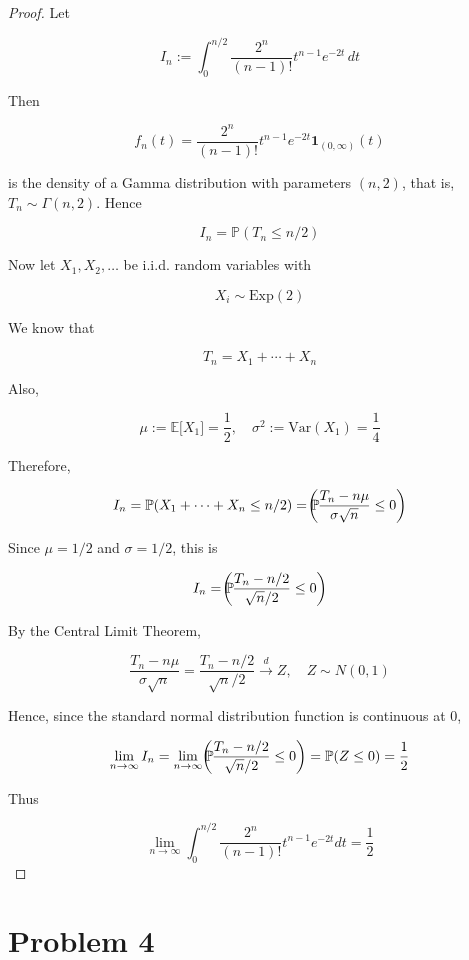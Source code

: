 \documentclass{qlnotes-export}
\begin{document}
\begin{proof}

Let

\[I_{n} := \int_{0}^{n/2}\frac{2^{n}}{(n - 1)!}t^{n - 1}e^{- 2t}\, dt\]

Then

\[f_{n}(t) = \frac{2^{n}}{(n - 1)!}t^{n - 1}e^{- 2t}\mathbf{1}_{(0,\infty)}(t)\]

is the density of a Gamma distribution with parameters \((n,2)\), that is, \(T_{n} \sim \Gamma(n,2)\). Hence

\[I_{n} = {\mathbb{P}}(T_{n} \leq n/2)\]

Now let \(X_{1},X_{2},\ldots\) be i.i.d. random variables with

\[X_{i} \sim \text{Exp}(2)\]

We know that

\[T_{n} = X_{1} + \cdots + X_{n}\]

Also,

\[\mu := {\mathbb{E}}\lbrack X_{1}\rbrack = \frac{1}{2},\quad\sigma^{2} := \text{Var}(X_{1}) = \frac{1}{4}\]

Therefore,

\[I_{n} = {\mathbb{P}}(X_{1} + \cdots + X_{n} \leq n/2) = {\mathbb{P}}\mspace{-18mu}\left( {\frac{T_{n} - n\mu}{\sigma\sqrt{n}} \leq 0} \right)\]

Since \(\mu = 1/2\) and \(\sigma = 1/2\), this is

\[I_{n} = {\mathbb{P}}\mspace{-18mu}\left( {\frac{T_{n} - n/2}{\sqrt{n}/2} \leq 0} \right)\]

By the Central Limit Theorem,

\[\frac{T_{n} - n\mu}{\sigma\sqrt{n}} = \frac{T_{n} - n/2}{\sqrt{n}/2}\overset{d}{\rightarrow}Z,\quad Z \sim N(0,1)\]

Hence, since the standard normal distribution function is continuous at \(0\),

\[\lim\limits_{n\rightarrow\infty}I_{n} = \lim\limits_{n\rightarrow\infty}{\mathbb{P}}\mspace{-18mu}\left( {\frac{T_{n} - n/2}{\sqrt{n}/2} \leq 0} \right) = {\mathbb{P}}(Z \leq 0) = \frac{1}{2}\]

Thus

\[\lim\limits_{n\rightarrow\infty}\int_{0}^{n/2}\frac{2^{n}}{(n - 1)!}t^{n - 1}e^{- 2t}dt = \frac{1}{2}\]

\end{proof}

\section{Problem 4}\label{problem-4-6}
\end{document}
